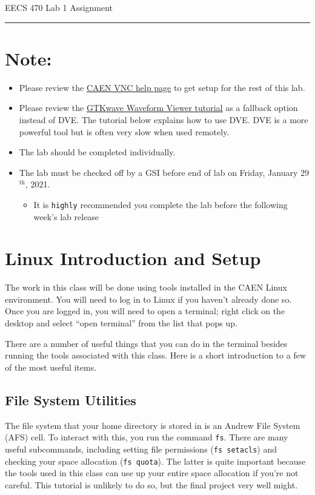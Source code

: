 \documentclass[dvipsnames]{article}
\newcommand{\shortbar}{
	\vspace*{-12pt}
	\begin{center}
		\rule{5ex}{0.1pt}
	\end{center}
}
\newcommand{\lab}[1]{
	\begin{center}
		\LARGE{
			\vspace*{-32pt}
			EECS 470 Lab #1 Assignment
			\shortbar
			\vspace*{-20pt}
		}
	\end{center}
}
\begin{document}
\lab{1}

\section*{Note:}
\begin{itemize}
	\item Please review the \href{https://caenfaq.engin.umich.edu/linux-login/how-do-i-connect-to-a-caen-linux-computer-remotely}{\underline{CAEN VNC help page}} to get setup for the rest of this lab.	
	\item Please review the \href{https://docs.google.com/document/d/1U9FOOYAPqvhSQda-v66SCmUgdvuaBs1KIK8Ht4_WSCA/edit?usp=sharing}{\underline{GTKwave Waveform Viewer tutorial}} as a fallback option instead of DVE. The tutorial below explains how to use DVE. DVE is a more powerful tool but is often very slow when used remotely.
	\item The lab should be completed individually. 
	\item The lab must be checked off by a GSI before end of lab on Friday,
		January 29$^\text{th}$, 2021.
	\begin{itemize}
		\item It is \texttt{highly} recommended you complete the lab before the following week's lab release
		\end{itemize}
\end{itemize}

\section{Linux Introduction and Setup}
The work in this class will be done using tools installed in the CAEN Linux
environment. You will need to log in to Linux if you haven't already done so.
Once you are logged in, you will need to open a terminal; right click on the
desktop and select ``open terminal'' from the list that pops up. 

There are a number of useful things that you can do in the terminal besides
running the tools associated with this class. Here is a short introduction to a
few of the most useful items.

\subsection{File System Utilities}
The file system that your home directory is stored in is an Andrew File System
(AFS) cell. To interact with this, you run the command \texttt{fs}. There are
many useful subcommands, including setting file permissions (\texttt{fs
setacls}) and checking your space allocation (\texttt{fs quota}). The latter is
quite important because the tools used in this class can use up your entire
space allocation if you're not careful. This tutorial is unlikely to do so, but
the final project very well might.
\end{document}
